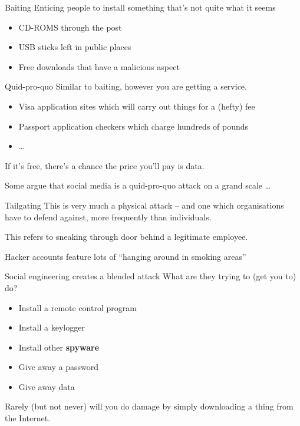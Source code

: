 \documentclass[xcolor=table]{beamer}
\begin{document}
\begin{frame}{Baiting}
	Enticing people to install something that's not quite what it seems
	\begin{itemize}
		\item CD-ROMS through the post
		\item USB sticks left in public places
		\item Free downloads that have a malicious aspect
	\end{itemize}
\end{frame}
\begin{frame}{Quid-pro-quo}
	Similar to baiting,  however you are getting a service.

	\begin{itemize}
		\item Visa application sites which will carry out things for a (hefty) fee
		\item Passport application checkers which charge hundreds of pounds 
		\item \ldots
	\end{itemize}

	If it's free, there's a chance the price you'll pay is data.

	\vspace{0.5em}


	Some argue that social media is a quid-pro-quo attack on a grand scale \ldots
\end{frame}

\begin{frame}{Tailgating}
	This is very much a physical attack -- and one which organisations have to defend against, more frequently than individuals.

	\vspace{0.5em}

 	This refers to sneaking through door behind a legitimate employee.  

	\vspace{0.5em}

	Hacker accounts feature lots of ``hanging around in smoking areas''

\end{frame}



\begin{frame}{Social engineering creates a blended attack}
	What are they trying to (get you to) do? 

	\begin{itemize}
		\item Install a remote control program
		\item Install a keylogger
		\item Install other \textbf{spyware}
		\item Give away a password
		\item Give away data
	\end{itemize}
	Rarely (but not never) will you do damage by simply downloading a thing from the Internet. 
\end{frame}
\end{document}
